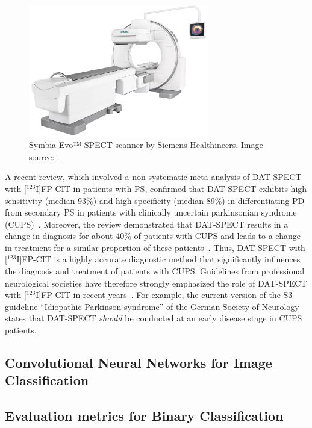 \begin{figure}[t]
  \centering
  \includegraphics[width=0.7\textwidth]{content/figures/siemens-healthineers_MI_symbia-evo.png}
  \caption{Symbia Evo™ SPECT scanner by Siemens Healthineers. Image source: \cite{SymbiaEvo_siemens}.} 
  \label{fig:siemens-healthineers_MI_symbia-evo}
\end{figure}

A recent review, which involved a non-systematic meta-analysis of DAT-SPECT with [$^{123}$I]FP-CIT in patients with PS, 
confirmed that DAT-SPECT exhibits high sensitivity (median 93\%) and high specificity (median 89\%) 
in differentiating PD from secondary PS in patients with 
clinically uncertain parkinsonian syndrome (CUPS)~\citep{Buchert2019-ya}.
Moreover, the review demonstrated that DAT-SPECT results in a change in diagnosis for about 40\% of patients with CUPS
and leads to a change in treatment for a similar proportion of these patients~\citep{Buchert2019-ya}. 
Thus, DAT-SPECT with [$^{123}$I]FP-CIT is a highly accurate diagnostic method
that significantly influences the diagnosis and treatment of patients with CUPS.
Guidelines from professional neurological societies have therefore strongly emphasized 
the role of DAT-SPECT with [$^{123}$I]FP-CIT in recent years~\citep{Tatsch2013}.
For example, the current version of the S3 guideline “Idiopathic Parkinson syndrome” of the 
German Society of Neurology states that DAT-SPECT \textit{should} be conducted at an early disease stage in CUPS patients.

\subsection{Convolutional Neural Networks for Image Classification}
\label{subsec:randfors}






\subsection{Evaluation metrics for Binary Classification}



